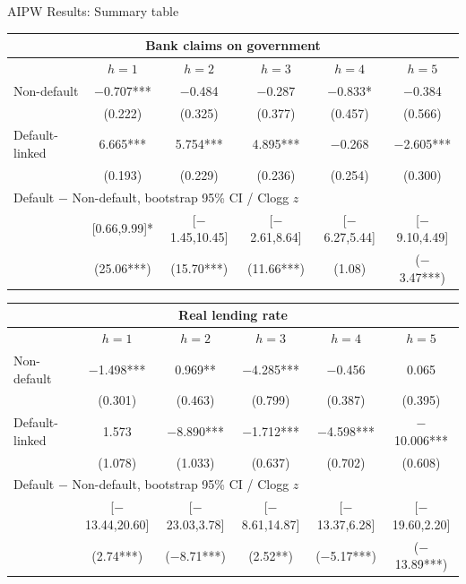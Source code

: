 \documentclass[aspectratio=169]{beamer}
\begin{document}
\begin{frame}{AIPW Results: Summary table}
  \tiny
  \begin{center}
  \renewcommand{\arraystretch}{1.0}
  \begin{tabular*}{0.92\linewidth}{@{\extracolsep{\fill}}lccccc}
  \multicolumn{6}{c}{\normalsize Bank claims on government} \\
  \toprule
   & $h=1$ & $h=2$ & $h=3$ & $h=4$ & $h=5$ \\
  \midrule
  Non-default & $-$0.707*** & $-$0.484 & $-$0.287 & $-$0.833* & $-$0.384 \\
   & (0.222) & (0.325) & (0.377) & (0.457) & (0.566) \\[1pt]
  Default-linked & 6.665*** & 5.754*** & 4.895*** & $-$0.268 & $-$2.605*** \\
   & (0.193) & (0.229) & (0.236) & (0.254) & (0.300) \\
  \midrule
  \multicolumn{6}{l}{Default $-$ Non-default, bootstrap 95\% CI / Clogg $z$} \\
  & [0.66,9.99]* & [$-$1.45,10.45] & [$-$2.61,8.64] & [$-$6.27,5.44] & [$-$9.10,4.49] \\
  & (25.06***) & (15.70***) & (11.66***) & (1.08) & ($-$3.47***) \\
  \bottomrule
  \end{tabular*}
  \vspace{0.5em}
  \begin{tabular*}{0.92\linewidth}{@{\extracolsep{\fill}}lccccc}
  \multicolumn{6}{c}{\normalsize Real lending rate} \\
  \toprule
   & $h=1$ & $h=2$ & $h=3$ & $h=4$ & $h=5$ \\
  \midrule
  Non-default & $-$1.498*** & 0.969** & $-$4.285*** & $-$0.456 & 0.065 \\
   & (0.301) & (0.463) & (0.799) & (0.387) & (0.395) \\[1pt]
  Default-linked & 1.573 & $-$8.890*** & $-$1.712*** & $-$4.598*** & $-$10.006*** \\
   & (1.078) & (1.033) & (0.637) & (0.702) & (0.608) \\
  \midrule
  \multicolumn{6}{l}{Default $-$ Non-default, bootstrap 95\% CI / Clogg $z$} \\
  & [$-$13.44,20.60] & [$-$23.03,3.78] & [$-$8.61,14.87] & [$-$13.37,6.28] & [$-$19.60,2.20] \\
  & (2.74***) & ($-$8.71***) & (2.52**) & ($-$5.17***) & ($-$13.89***) \\
  \bottomrule
  \end{tabular*}
  \end{center}
\end{frame}
\end{document}
